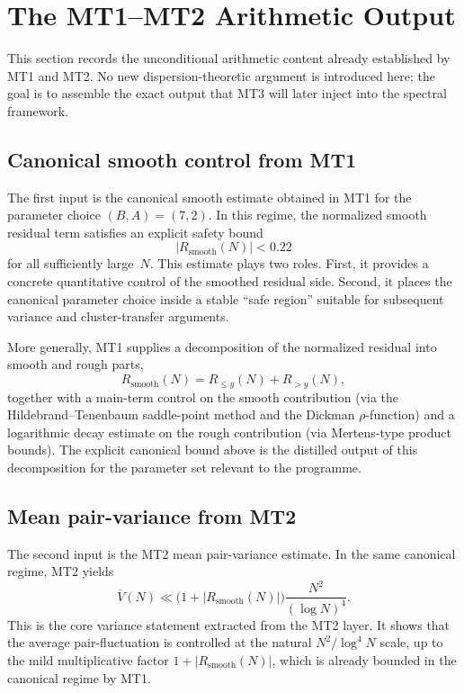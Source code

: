 \documentclass[11pt,a4paper]{article}
\begin{document}
\section{The MT1--MT2 Arithmetic Output}

This section records the unconditional arithmetic content already established by MT1 and MT2. No new dispersion-theoretic argument is introduced here; the goal is to assemble the exact output that MT3 will later inject into the spectral framework.

\subsection{Canonical smooth control from MT1}

The first input is the canonical smooth estimate obtained in MT1 for the parameter choice $(B,A) = (7,2)$. In this regime, the normalized smooth residual term satisfies an explicit safety bound
\[
|R_{\mathrm{smooth}}(N)| < 0.22
\]
for all sufficiently large~$N$. This estimate plays two roles. First, it provides a concrete quantitative control of the smoothed residual side. Second, it places the canonical parameter choice inside a stable ``safe region'' suitable for subsequent variance and cluster-transfer arguments.

More generally, MT1 supplies a decomposition of the normalized residual into smooth and rough parts,
\[
R_{\mathrm{smooth}}(N) = R_{\le y}(N) + R_{>y}(N),
\]
together with a main-term control on the smooth contribution (via the Hildebrand--Tenenbaum saddle-point method and the Dickman $\rho$-function) and a logarithmic decay estimate on the rough contribution (via Mertens-type product bounds). The explicit canonical bound above is the distilled output of this decomposition for the parameter set relevant to the programme.

\subsection{Mean pair-variance from MT2}

The second input is the MT2 mean pair-variance estimate. In the same canonical regime, MT2 yields
\[
\overline{V}(N) \ll \bigl(1 + |R_{\mathrm{smooth}}(N)|\bigr) \frac{N^2}{(\log N)^4}.
\]
This is the core variance statement extracted from the MT2 layer. It shows that the average pair-fluctuation is controlled at the natural $N^2/\log^4 N$ scale, up to the mild multiplicative factor $1 + |R_{\mathrm{smooth}}(N)|$, which is already bounded in the canonical regime by MT1.
\end{document}
